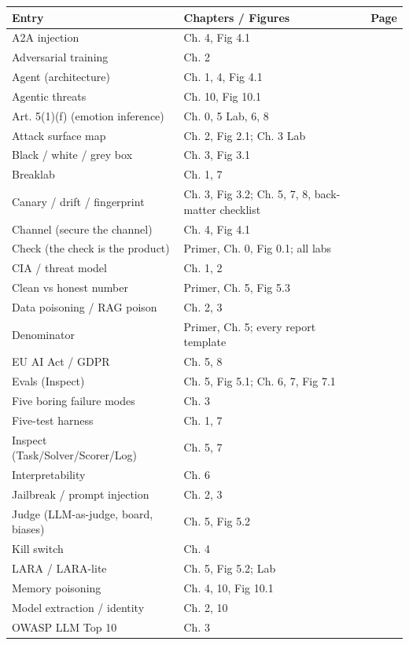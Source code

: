 \begin{center}
\begin{tabularx}{\linewidth}{lXr}
\toprule
Entry & Chapters / Figures & Page \\
\midrule
A2A injection & Ch. 4, Fig 4.1 &  \\
Adversarial training & Ch. 2 &  \\
Agent (architecture) & Ch. 1, 4, Fig 4.1 &  \\
Agentic threats & Ch. 10, Fig 10.1 &  \\
Art. 5(1)(f) (emotion inference) & Ch. 0, 5 Lab, 6, 8 &  \\
Attack surface map & Ch. 2, Fig 2.1; Ch. 3 Lab &  \\
Black / white / grey box & Ch. 3, Fig 3.1 &  \\
Breaklab & Ch. 1, 7 &  \\
Canary / drift / fingerprint & Ch. 3, Fig 3.2; Ch. 5, 7, 8, back-matter checklist &  \\
Channel (secure the channel) & Ch. 4, Fig 4.1 &  \\
Check (the check is the product) & Primer, Ch. 0, Fig 0.1; all labs &  \\
CIA / threat model & Ch. 1, 2 &  \\
Clean vs honest number & Primer, Ch. 5, Fig 5.3 &  \\
Data poisoning / RAG poison & Ch. 2, 3 &  \\
Denominator & Primer, Ch. 5; every report template &  \\
EU AI Act / GDPR & Ch. 5, 8 &  \\
Evals (Inspect) & Ch. 5, Fig 5.1; Ch. 6, 7, Fig 7.1 &  \\
Five boring failure modes & Ch. 3 &  \\
Five-test harness & Ch. 1, 7 &  \\
Inspect (Task/Solver/Scorer/Log) & Ch. 5, 7 &  \\
Interpretability & Ch. 6 &  \\
Jailbreak / prompt injection & Ch. 2, 3 &  \\
Judge (LLM-as-judge, board, biases) & Ch. 5, Fig 5.2 &  \\
Kill switch & Ch. 4 &  \\
LARA / LARA-lite & Ch. 5, Fig 5.2; Lab &  \\
Memory poisoning & Ch. 4, 10, Fig 10.1 &  \\
Model extraction / identity & Ch. 2, 10 &  \\
OWASP LLM Top 10 & Ch. 3 &  \\

\end{tabularx}
\end{center}
